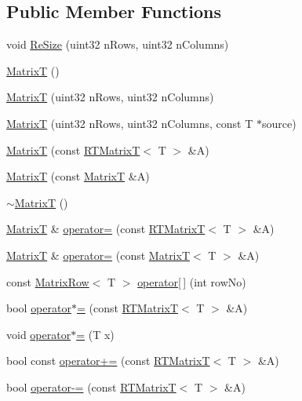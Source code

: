\subsection*{Public Member Functions}
\begin{DoxyCompactItemize}
\item 
void \hyperlink{classMatrixT_a714fbd6bfdec6d76066eae21e86f693c}{ReSize} (uint32 nRows, uint32 nColumns)
\item 
\hyperlink{classMatrixT_ab9d90c99b98b11471a01695b145c6415}{MatrixT} ()
\item 
\hyperlink{classMatrixT_a1273ec656bc69793f67e7feccdfd37f6}{MatrixT} (uint32 nRows, uint32 nColumns)
\item 
\hyperlink{classMatrixT_a0619cdab01425d05a7f2bb2d253091f5}{MatrixT} (uint32 nRows, uint32 nColumns, const T $\ast$source)
\item 
\hyperlink{classMatrixT_abbdff52c78a71a6d1a743f07f08c525e}{MatrixT} (const \hyperlink{classRTMatrixT}{RTMatrixT}$<$ T $>$ \&A)
\item 
\hyperlink{classMatrixT_aceea7e277d78309b8934a0b93e13c904}{MatrixT} (const \hyperlink{classMatrixT}{MatrixT} \&A)
\item 
\hyperlink{classMatrixT_a8292b69becb7cf206d75e699767e68b3}{$\sim$MatrixT} ()
\item 
\hyperlink{classMatrixT}{MatrixT} \& \hyperlink{classMatrixT_a157b5b4b281c2ab15a5e0797150e6a5d}{operator=} (const \hyperlink{classRTMatrixT}{RTMatrixT}$<$ T $>$ \&A)
\item 
\hyperlink{classMatrixT}{MatrixT} \& \hyperlink{classMatrixT_afe5a46a81564d716c0a70cb14aff80c9}{operator=} (const \hyperlink{classMatrixT}{MatrixT}$<$ T $>$ \&A)
\item 
const \hyperlink{classMatrixRow}{MatrixRow}$<$ T $>$ \hyperlink{classMatrixT_a8c84047f97f2d07290a7882884e50397}{operator\mbox{[}$\,$\mbox{]}} (int rowNo)
\item 
bool \hyperlink{classMatrixT_a34f8d56e92dad7d8eafd64afcd3c81f4}{operator$\ast$=} (const \hyperlink{classRTMatrixT}{RTMatrixT}$<$ T $>$ \&A)
\item 
void \hyperlink{classMatrixT_adc5f8700b8cdab6c65b3659b90eb550c}{operator$\ast$=} (T x)
\item 
bool const \hyperlink{classMatrixT_a3383eabbe87a7ebe255b3d409f005f9d}{operator+=} (const \hyperlink{classRTMatrixT}{RTMatrixT}$<$ T $>$ \&A)
\item 
bool \hyperlink{classMatrixT_a87aae833ab29686ae8bbaab0cb9c379f}{operator-\/=} (const \hyperlink{classRTMatrixT}{RTMatrixT}$<$ T $>$ \&A)
\end{DoxyCompactItemize}


